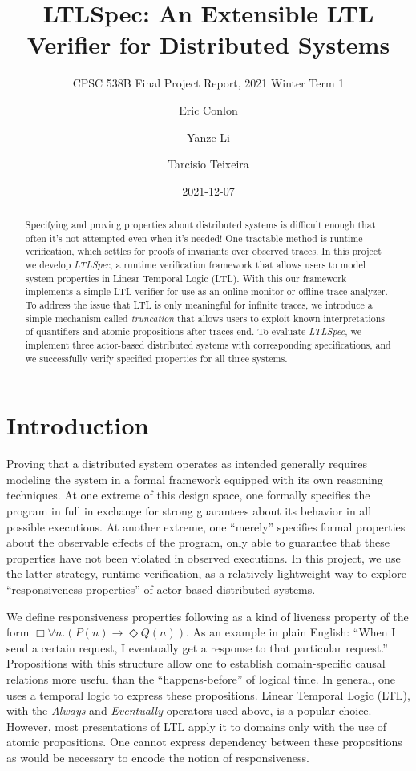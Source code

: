 \documentclass[format=acmsmall, nonacm=true, review=true, screen=true]{acmart}
\title{LTLSpec: An Extensible LTL Verifier for Distributed Systems}
\subtitle{CPSC 538B Final Project Report, 2021 Winter Term 1}
\author{Eric Conlon}
\author{Yanze Li}
\author{Tarcisio Teixeira}
\date{2021-12-07}
\newcommand{\ltlspec}{\textit{LTLSpec}\xspace}
\begin{document}
\begin{abstract}
  Specifying and proving properties about distributed systems is difficult enough that often it's not attempted even when it's needed!
  One tractable method is runtime verification, which settles for proofs of invariants over observed traces.
  In this project we develop \ltlspec, a runtime verification framework that allows users to model system properties in Linear Temporal Logic (LTL).
  With this our framework implements a simple LTL verifier for use as an online monitor or offline trace analyzer.
  To address the issue that LTL is only meaningful for infinite traces, we introduce a simple mechanism called \textit{truncation} that allows users to exploit known interpretations of quantifiers and atomic propositions after traces end.
  To evaluate \ltlspec, we implement three actor-based distributed systems with corresponding specifications, and we successfully verify specified properties for all three systems.
\end{abstract}

\maketitle

\section{Introduction}

Proving that a distributed system operates as intended generally requires modeling the system in a formal framework equipped with its own reasoning techniques.
At one extreme of this design space, one formally specifies the program in full in exchange for strong guarantees about its behavior in all possible executions.
At another extreme, one “merely” specifies formal properties about the observable effects of the program, only able to guarantee that these properties have not been violated in observed executions.
In this project, we use the latter strategy, runtime verification, as a relatively lightweight way to explore “responsiveness properties” of actor-based distributed systems.

We define responsiveness properties following \cite{actorservice,parthasarathy2018modular} as a kind of liveness property of the form \(\Box \forall n. (P(n) \rightarrow \Diamond Q(n))\).
As an example in plain English: “When I send a certain request, I eventually get a response to that particular request.” Propositions with this structure allow one to establish domain-specific causal relations more useful than the “happens-before” of logical time.
In general, one uses a temporal logic to express these propositions. Linear Temporal Logic (LTL), with the \textit{Always} and \textit{Eventually} operators used above, is a popular choice. However, most presentations of LTL apply it to domains only with the use of atomic propositions. One cannot express dependency between these propositions as would be necessary to encode the notion of responsiveness.
\end{document}
